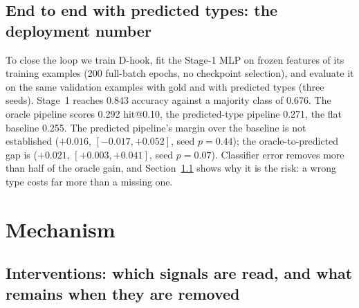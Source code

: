 \documentclass{article}
\makeatletter
\newcommand{\hitat}[1]{hit@#1}
\makeatother
\begin{document}
\subsection{End to end with predicted types: the deployment number}
\label{sec:e2e}
To close the loop we train D-hook, fit the Stage-1 MLP on frozen features of its training examples (200 full-batch epochs, no checkpoint selection), and evaluate it on the same validation examples with gold and with predicted types (three seeds). Stage~1 reaches 0.843 accuracy against a majority class of 0.676. The oracle pipeline scores 0.292 \hitat{0.10}, the predicted-type pipeline 0.271, the flat baseline 0.255. The predicted pipeline's margin over the baseline is not established ($+0.016$, $[-0.017, +0.052]$, seed $p = 0.44$); the oracle-to-predicted gap is ($+0.021$, $[+0.003, +0.041]$, seed $p = 0.07$). Classifier error removes more than half of the oracle gain, and Section~\ref{sec:interventions} shows why it is the risk: a wrong type costs far more than a missing one.


\section{Mechanism}
\label{sec:mechanism}

\subsection{Interventions: which signals are read, and what remains when they are removed}
\label{sec:interventions}


\end{document}
